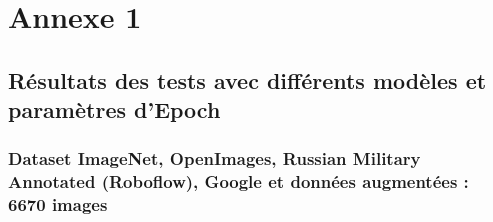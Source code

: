 
\chapter*{Annexe 1}
\label{chap:appendix}
\section*{Résultats des tests avec différents modèles et paramètres d'Epoch}

\subsection*{Dataset ImageNet, OpenImages, Russian Military Annotated (Roboflow), Google et données augmentées : 6670 images}

